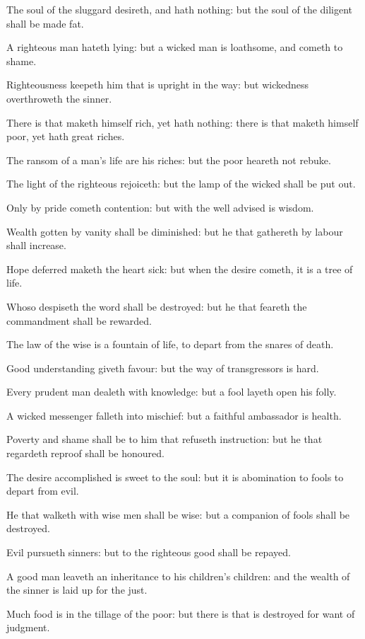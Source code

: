 \Verse The soul of the sluggard desireth, and hath nothing: but the soul of the diligent shall be made fat.

\Verse A righteous man hateth lying: but a wicked man is loathsome, and cometh to shame.

\Verse Righteousness keepeth him that is upright in the way: but wickedness overthroweth the sinner.

\Verse There is that maketh himself rich, yet hath nothing: there is that maketh himself poor, yet hath great riches.

\Verse The ransom of a man's life are his riches: but the poor heareth not rebuke.

\Verse The light of the righteous rejoiceth: but the lamp of the wicked shall be put out.

\Verse Only by pride cometh contention: but with the well advised is wisdom.

\Verse Wealth gotten by vanity shall be diminished: but he that gathereth by labour shall increase.

\Verse Hope deferred maketh the heart sick: but when the desire cometh, it is a tree of life.

\Verse Whoso despiseth the word shall be destroyed: but he that feareth the commandment shall be rewarded.

\Verse The law of the wise is a fountain of life, to depart from the snares of death.

\Verse Good understanding giveth favour: but the way of transgressors is hard.

\Verse Every prudent man dealeth with knowledge: but a fool layeth open his folly.

\Verse A wicked messenger falleth into mischief: but a faithful ambassador is health.

\Verse Poverty and shame shall be to him that refuseth instruction: but he that regardeth reproof shall be honoured.

\Verse The desire accomplished is sweet to the soul: but it is abomination to fools to depart from evil.

\Verse He that walketh with wise men shall be wise: but a companion of fools shall be destroyed.

\Verse Evil pursueth sinners: but to the righteous good shall be repayed.

\Verse A good man leaveth an inheritance to his children's children: and the wealth of the sinner is laid up for the just.

\Verse Much food is in the tillage of the poor: but there is that is destroyed for want of judgment.

